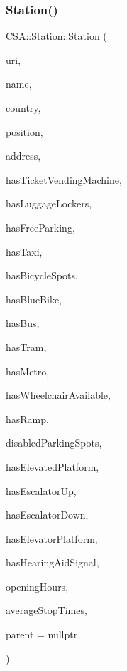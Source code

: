 \subsubsection{\texorpdfstring{Station()}{Station()}\hspace{0.1cm}{\footnotesize\ttfamily [3/3]}}
{\footnotesize\ttfamily C\+S\+A\+::\+Station\+::\+Station (\begin{DoxyParamCaption}\item[{const Q\+Url \&}]{uri,  }\item[{const Q\+Map$<$ Q\+Locale\+::\+Language, Q\+String $>$ \&}]{name,  }\item[{const Q\+Locale\+::\+Country \&}]{country,  }\item[{const Q\+Geo\+Coordinate \&}]{position,  }\item[{const Q\+Geo\+Address \&}]{address,  }\item[{const bool \&}]{has\+Ticket\+Vending\+Machine,  }\item[{const bool \&}]{has\+Luggage\+Lockers,  }\item[{const bool \&}]{has\+Free\+Parking,  }\item[{const bool \&}]{has\+Taxi,  }\item[{const bool \&}]{has\+Bicycle\+Spots,  }\item[{const bool \&}]{has\+Blue\+Bike,  }\item[{const bool \&}]{has\+Bus,  }\item[{const bool \&}]{has\+Tram,  }\item[{const bool \&}]{has\+Metro,  }\item[{const bool \&}]{has\+Wheelchair\+Available,  }\item[{const bool \&}]{has\+Ramp,  }\item[{const qint16 \&}]{disabled\+Parking\+Spots,  }\item[{const bool \&}]{has\+Elevated\+Platform,  }\item[{const bool \&}]{has\+Escalator\+Up,  }\item[{const bool \&}]{has\+Escalator\+Down,  }\item[{const bool \&}]{has\+Elevator\+Platform,  }\item[{const bool \&}]{has\+Hearing\+Aid\+Signal,  }\item[{const Q\+Map$<$ \mbox{\hyperlink{classCSA_1_1Station_aa160d0de40db0583099b5986dea1cd67}{C\+S\+A\+::\+Station\+::\+Day}}, Q\+Pair$<$ Q\+Time, Q\+Time $>$$>$ \&}]{opening\+Hours,  }\item[{const qreal \&}]{average\+Stop\+Times,  }\item[{Q\+Object $\ast$}]{parent = {\ttfamily nullptr} }\end{DoxyParamCaption})\hspace{0.3cm}{\ttfamily [explicit]}}



